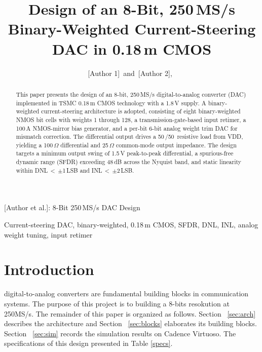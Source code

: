 \documentclass[lettersize,journal]{IEEEtran}
\begin{document}
\title{Design of an 8-Bit, 250\,MS/s Binary-Weighted Current-Steering DAC in 0.18\,\textmu m CMOS}

\author{[Author 1]~and~[Author 2],~
        }

%
{[Author et al.]: 8-Bit 250\,MS/s DAC Design}

\maketitle

\begin{abstract}
This paper presents the design of an 8-bit, 250\,MS/s digital-to-analog converter (DAC)
implemented in TSMC 0.18\,\textmu m CMOS technology with a 1.8\,V supply.
A binary-weighted current-steering architecture is adopted, consisting of eight
binary-weighted NMOS bit cells with weights 1 through 128, a transmission-gate-based
input retimer, a 100\,\textmu A NMOS-mirror bias generator, and a per-bit 6-bit
analog weight trim DAC for mismatch correction.
The differential output drives a 50\,\textOmega{}/50\,\textOmega{} resistive load from VDD,
yielding a 100\,$\Omega$ differential and 25\,$\Omega$ common-mode output impedance.
The design targets a minimum output swing of 1.5\,V peak-to-peak differential,
a spurious-free dynamic range (SFDR) exceeding 48\,dB across the Nyquist band,
and static linearity within DNL\,$<$\,$\pm$1\,LSB and INL\,$<$\,$\pm$2\,LSB.
\end{abstract}

\begin{IEEEkeywords}
Current-steering DAC, binary-weighted, 0.18\,\textmu m CMOS, SFDR, DNL, INL, analog weight tuning, input retimer
\end{IEEEkeywords}

\section{Introduction}
 digital-to-analog converters are fundamental building
blocks in communication systems. The purpose of this project is to building
a 8-bits resokution at 250MS/s. The remainder of this paper
is organized as follows. Section ~\ref{sec:arch} describes the architecture and Section ~\ref{sec:blocks} elaborates its building
blocks. Section ~\ref{sec:sim} records the simulation results on Cadence Virtuoso. The specifications of this design presented in Table \ref{specs}.
\end{document}
